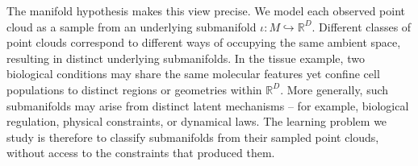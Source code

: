 \documentclass{article}
\newcommand{\R}{\mathbb{R}}
\newcommand{\kelly}[1]{}
\newcommand{\katya}[1]{}
\theoremstyle{remark}
\theoremstyle{plain}
\begin{document}


The manifold hypothesis makes this view precise. We model each observed point cloud as a sample from an underlying submanifold $\iota:M\hookrightarrow \mathbb{R}^D$. Different classes of point clouds correspond to different ways of occupying the same ambient space, resulting in distinct underlying submanifolds. In the tissue example, two biological conditions may share the same molecular features yet confine cell populations to distinct regions or geometries within $\mathbb{R}^D$. More generally, such submanifolds may arise from distinct latent mechanisms -- for example, biological regulation, physical constraints, or dynamical laws. The learning problem we study is therefore to classify submanifolds from their sampled point clouds, without access to the constraints that produced them.


\end{document}
